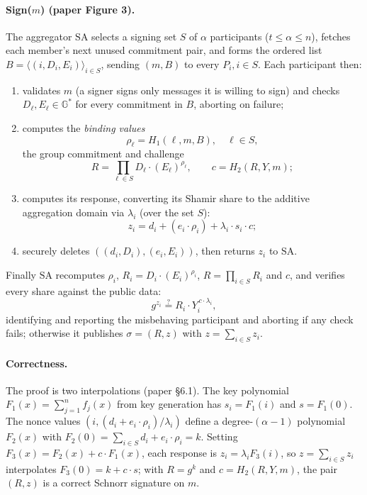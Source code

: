 \documentclass[11pt,a4paper]{article}
\theoremstyle{definition}
\newcommand{\G}{\mathbb{G}}
\begin{document}
\paragraph{Sign($m$) (paper Figure 3).} The aggregator $\mathrm{SA}$
selects a signing set $S$ of $\alpha$ participants
($t \le \alpha \le n$), fetches each member's next unused commitment
pair, and forms the ordered list
$B = \langle (i, D_i, E_i) \rangle_{i \in S}$, sending $(m, B)$ to every
$P_i, i \in S$. Each participant then:
\begin{enumerate}
\item validates $m$ (a signer signs only messages it is willing to sign)
  and checks $D_\ell, E_\ell \in \G^*$ for every commitment in $B$,
  aborting on failure;
\item computes the \emph{binding values}
  \[
  \rho_\ell = H_1(\ell, m, B), \quad \ell \in S,
  \]
  the group commitment and challenge
  \[
  R = \prod_{\ell \in S} D_\ell \cdot (E_\ell)^{\rho_\ell}, \qquad
  c = H_2(R, Y, m);
  \]
\item computes its response, converting its Shamir share to the additive
  aggregation domain via $\lambda_i$ (over the set $S$):
  \[
  z_i = d_i + (e_i \cdot \rho_i) + \lambda_i \cdot s_i \cdot c ;
  \]
\item securely deletes $((d_i, D_i), (e_i, E_i))$, then returns $z_i$ to
  $\mathrm{SA}$.
\end{enumerate}
Finally $\mathrm{SA}$ recomputes $\rho_i$, $R_i = D_i \cdot
(E_i)^{\rho_i}$, $R = \prod_{i \in S} R_i$ and $c$, and verifies every
share against the public data:
\[
g^{z_i} \stackrel{?}{=} R_i \cdot Y_i^{\,c \cdot \lambda_i},
\]
identifying and reporting the misbehaving participant and aborting if any
check fails; otherwise it publishes $\sigma = (R, z)$ with
$z = \sum_{i \in S} z_i$.

\paragraph{Correctness.} The proof is two interpolations (paper \S6.1).
The key polynomial $F_1(x) = \sum_{j=1}^n f_j(x)$ from key generation has
$s_i = F_1(i)$ and $s = F_1(0)$. The nonce values
$(i, (d_i + e_i \cdot \rho_i)/\lambda_i)$ define a degree-$(\alpha-1)$
polynomial $F_2(x)$ with
$F_2(0) = \sum_{i \in S} d_i + e_i \cdot \rho_i = k$. Setting
$F_3(x) = F_2(x) + c \cdot F_1(x)$, each response is
$z_i = \lambda_i F_3(i)$, so $z = \sum_{i \in S} z_i$ interpolates
$F_3(0) = k + c \cdot s$; with $R = g^k$ and $c = H_2(R, Y, m)$, the pair
$(R, z)$ is a correct Schnorr signature on $m$.
\end{document}

